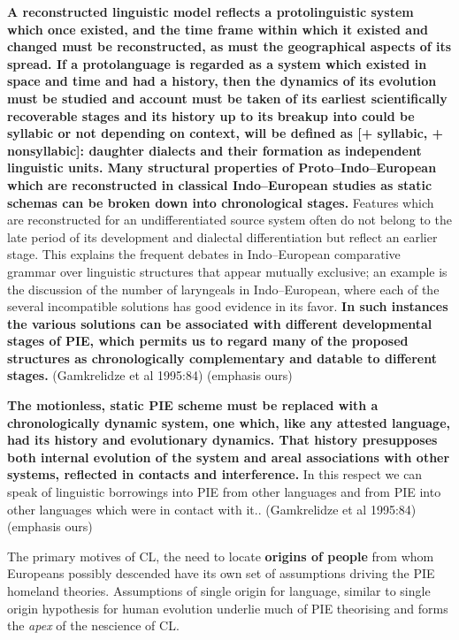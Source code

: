 \begin{myquote}
\textbf{A reconstructed linguistic model reflects a protolinguistic system which once existed, and the time frame within which it existed and changed must be reconstructed, as must the geographical aspects of its spread. If a protolanguage is regarded as a system which existed in space and time and had a history, then the dynamics of its evolution must be studied and account must be taken of its earliest scientifically recoverable stages and its history up to its breakup into could be syllabic or not depending on context, will be defined as [+ syllabic, + nonsyllabic]: daughter dialects and their formation as independent linguistic units. Many structural properties of Proto–Indo–European which are reconstructed in classical Indo–European studies as static schemas can be broken down into chronological stages.} Features which are reconstructed for an undifferentiated source system often do not belong to the late period of its development and dialectal differentiation but reflect an earlier stage. This explains the frequent debates in Indo–European comparative grammar over linguistic structures that appear mutually exclusive; an example is the discussion of the number of laryngeals in Indo–European, where each of the several incompatible solutions has good evidence in its favor. \textbf{In such instances the various solutions can be associated with different developmental stages of PIE, which permits us to regard many of the proposed structures as chronologically complementary and datable to different stages.} (Gamkrelidze et al 1995:84) (emphasis ours)
\end{myquote}

\begin{myquote}
\textbf{The motionless, static PIE scheme must be replaced with a chronologically dynamic system, one which, like any attested language, had its history and evolutionary dynamics. That history presupposes both internal evolution of the system and areal associations with other systems, reflected in contacts and interference.} In this respect we can speak of linguistic borrowings into PIE from other languages and from PIE into other languages which were in contact with it.. (Gamkrelidze et al 1995:84) (emphasis ours)
\end{myquote}

The primary motives of CL, the need to locate \textbf{origins of people} from whom Europeans possibly descended have its own set of assumptions driving the PIE homeland theories. Assumptions of single origin for language, similar to single origin hypothesis for human evolution underlie much of PIE theorising and forms the \textit{apex} of the nescience of CL.

